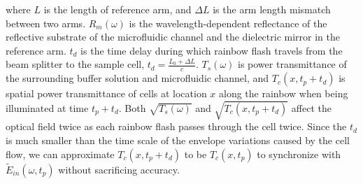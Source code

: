 \documentclass[aps,pra,reprint,superscriptaddress]{revtex4-1}
\begin{document}
where $L$ is the length of reference arm, and $\Delta L$ is the arm length mismatch between two arms. $R_m(\omega)$ is the wavelength-dependent reflectance of the reflective substrate of the microfluidic channel and the dielectric mirror in the reference arm. $t_d$ is the time delay during which rainbow flash travels from the beam splitter to the sample cell, $t_d = \frac{L_0 + \Delta L}{c}$. $T_s(\omega)$ is power transmittance of the surrounding buffer solution and microfluidic channel, and $T_c(x,t_p + t_d)$ is spatial power transmittance of cells at location $x$ along the rainbow when being illuminated at time $t_p + t_d$. Both $\sqrt{T_s(\omega)}$ and $\sqrt{T_c(x,t_p + t_d)}$ affect the optical field twice as each rainbow flash passes through the cell twice. Since the $t_d$ is much smaller than the time scale of the envelope variations caused by the cell flow, we can approximate $T_c(x,t_p + t_d)$ to be $T_c(x,t_p)$ to synchronize with $\tilde{E}_{in}(\omega, t_p)$ without sacrificing accuracy.
\end{document}
